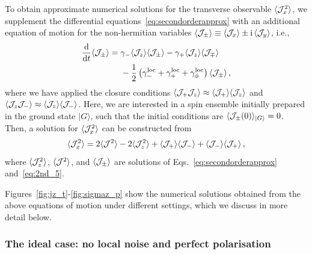 \documentclass[aps,prd,10pt,twocolumn,superscriptaddress,floatfix,nofootinbib,amsmath,amssymb,altaffilletter,preprintnumbers]{revtex4-1}
\begin{document}
To obtain approximate numerical solutions for the transverse observable $\langle {\cal J}^2_x\rangle$, we supplement the differential equations~\eqref{eq:secondorderapprox} with an additional equation of motion for  the non-hermitian variables $\langle {\cal J}_\pm \rangle \equiv \langle {\cal J}_x \rangle  \pm {\rm i} \, \langle {\cal J}_y \rangle$, i.e.,
\begin{equation}
\begin{aligned}
\frac{\rm d}{{\rm d}t} \langle {\cal J}_{\pm} \rangle = \; & \gamma_-  \langle {\cal J}_z \rangle \langle {\cal J}_{\pm} \rangle
- \gamma_+ \langle {\cal J}_z \rangle \langle {\cal J}_{\mp}\rangle\\
\; & - \frac{1}{2} \left(\gamma_-^{\rm loc}  +\gamma_+^{\rm loc} + \gamma_{\phi}^{\rm loc} \right) \langle {\cal J}_{\pm} \rangle \, ,
\label{eq:2nd_5}
\end{aligned}
\end{equation} 
where we have applied the closure conditions $\langle {\cal J}_+{\cal J}_z\rangle\approx\langle {\cal J}_+ \rangle\langle {\cal J}_z \rangle$ and $\langle {\cal J}_z{\cal J}_-\rangle\approx\langle {\cal J}_z \rangle\langle {\cal J}_- \rangle$. Here, we are interested in a spin ensemble initially prepared in the ground state $\vert G\rangle$, such that the initial conditions are $\langle {\cal J}_\pm(0)\rangle_{\vert G\rangle}=0$. Then, a solution for $\langle {\cal J}^2_x\rangle$ can be constructed from
\begin{equation}
 \langle {\cal J}^2_x\rangle=  2\langle {\cal J}^2\rangle-2\langle {\cal J}_z^2\rangle+\langle {\cal J}_+\rangle\langle {\cal J}_-\rangle+\langle {\cal J}_-\rangle\langle {\cal J}_+\rangle\, ,
\end{equation} 
where $\langle {\cal J}_z^2\rangle$, $\langle {\cal J}^2\rangle$, and $\langle {\cal J}_{\pm} \rangle$ are solutions of Eqs.~\eqref{eq:secondorderapprox} and~\eqref{eq:2nd_5}.

Figures~\ref{fig:jz_t}-\ref{fig:sigmaz_p} show the numerical solutions obtained from the above equations of motion under different settings, which we discuss in more detail below.






\subsubsection*{The ideal case: no local noise and perfect polarisation}
\end{document}
